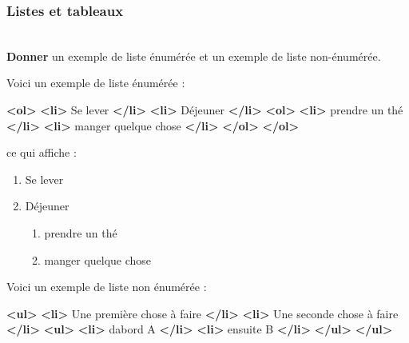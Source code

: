 \documentclass[a4paper,17pt]{extarticle}
\newenvironment{eleve}%
{\begin{activite}\color{noiramu}\\}
{\end{activite}}
\providecommand{\tightlist}{%
      \setlength{\itemsep}{0pt}\setlength{\parskip}{0pt}}
\newenvironment{Shaded}{}{}
\newcommand{\KeywordTok}[1]{\textcolor[rgb]{0.00,0.44,0.13}{\textbf{{#1}}}}
\newcommand{\NormalTok}[1]{{#1}}
\begin{document}
    \hypertarget{listes-et-tableaux}{%
\subsubsection{Listes et tableaux}\label{listes-et-tableaux}}
\begin{eleve}
    \textbf{Donner} un exemple de liste énumérée et un exemple de liste
non-énumérée.
        
        \end{eleve}\begin{reponse}
    Voici un exemple de liste énumérée :

\begin{Shaded}
\begin{Highlighting}[]
\KeywordTok{\textless{}ol\textgreater{}}
    \KeywordTok{\textless{}li\textgreater{}}\NormalTok{ Se lever }\KeywordTok{\textless{}/li\textgreater{}}
    \KeywordTok{\textless{}li\textgreater{}}\NormalTok{ Déjeuner }\KeywordTok{\textless{}/li\textgreater{}}
    \KeywordTok{\textless{}ol\textgreater{}}
        \KeywordTok{\textless{}li\textgreater{}}\NormalTok{ prendre un thé }\KeywordTok{\textless{}/li\textgreater{}}
        \KeywordTok{\textless{}li\textgreater{}}\NormalTok{ manger quelque chose }\KeywordTok{\textless{}/li\textgreater{}}
    \KeywordTok{\textless{}/ol\textgreater{}}
\KeywordTok{\textless{}/ol\textgreater{}}
\end{Highlighting}
\end{Shaded}

ce qui affiche :

\begin{enumerate}
\def\labelenumi{\arabic{enumi}.}
\tightlist
\item
  Se lever
\item
  Déjeuner

  \begin{enumerate}
  \def\labelenumii{\arabic{enumii}.}
  \tightlist
  \item
    prendre un thé
  \item
    manger quelque chose
  \end{enumerate}
\end{enumerate}

Voici un exemple de liste non énumérée :

\begin{Shaded}
\begin{Highlighting}[]
\KeywordTok{\textless{}ul\textgreater{}}
    \KeywordTok{\textless{}li\textgreater{}}\NormalTok{ Une première chose à faire }\KeywordTok{\textless{}/li\textgreater{}}
    \KeywordTok{\textless{}li\textgreater{}}\NormalTok{ Une seconde chose à faire }\KeywordTok{\textless{}/li\textgreater{}}
    \KeywordTok{\textless{}ul\textgreater{}}
        \KeywordTok{\textless{}li\textgreater{}}\NormalTok{ d\textquotesingle{}abord A }\KeywordTok{\textless{}/li\textgreater{}}
        \KeywordTok{\textless{}li\textgreater{}}\NormalTok{ ensuite B }\KeywordTok{\textless{}/li\textgreater{}}
    \KeywordTok{\textless{}/ul\textgreater{}}
\KeywordTok{\textless{}/ul\textgreater{}}
\end{Highlighting}
\end{Shaded}


\end{reponse}
\end{document}
